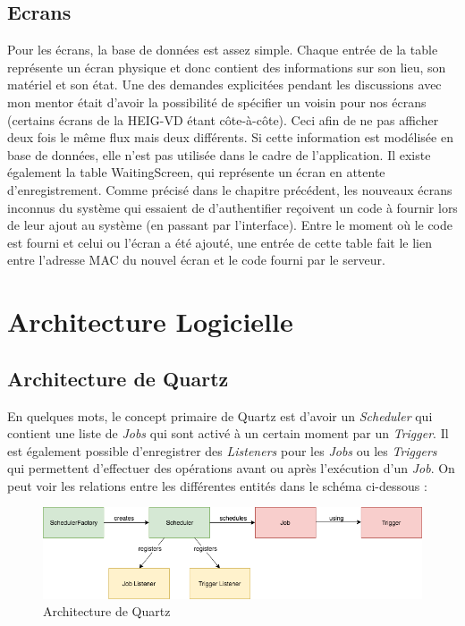 \documentclass[french]{article}
\begin{document}
\subsection{Ecrans}
Pour les écrans, la base de données est assez simple. Chaque entrée de la table représente un écran physique et donc contient des informations sur son lieu, son matériel et son état.  \newline
Une des demandes explicitées pendant les discussions avec mon mentor était d'avoir la possibilité de spécifier un voisin pour nos écrans (certains écrans de la HEIG-VD étant côte-à-côte). Ceci afin de ne pas afficher deux fois le même flux mais deux différents. Si cette information est modélisée en base de données, elle n'est pas utilisée dans le cadre de l'application.\newline
Il existe également la table WaitingScreen, qui représente un écran en attente d'enregistrement. Comme précisé dans le chapitre précédent, les nouveaux écrans inconnus du système qui essaient de d'authentifier reçoivent un code à fournir lors de leur ajout au système (en passant par l'interface). Entre le moment où le code est fourni et celui ou l'écran a été ajouté, une entrée de cette table fait le lien entre l'adresse MAC du nouvel écran et le code fourni par le serveur.

\newpage
\section{Architecture Logicielle}

\subsection{Architecture de Quartz}

En quelques mots, le concept primaire de Quartz est d'avoir un \textit{Scheduler} qui contient une liste de \textit{Jobs} qui sont activé à un certain moment par un \textit{Trigger}. Il est également possible d'enregistrer des \textit{Listeners} pour les \textit{Jobs} ou les \textit{Triggers} qui permettent d'effectuer des opérations avant ou après l'exécution d'un \textit{Job}. On peut voir les relations entre les différentes entités dans le schéma ci-dessous :

\begin{figure}[h]
	\centering	
	\includegraphics[width=0.8\linewidth]{schemas/quartz_arch.png}%
	\caption{Architecture de Quartz}
\end{figure}
\end{document}
